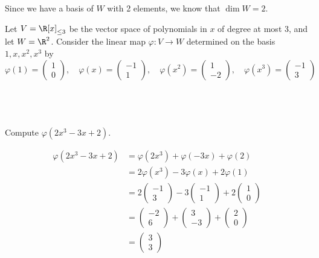 \documentclass[a4paper]{article}
\begin{document}
Since we have a basis of $W$ with 2 elements, we know that $\dim W = 2$.



\begin{questionbody}
Let $V = \R[x]_{\le 3}$ be the vector space of polynomials in $x$ of degree at most $3$, and let $W = \R^2$. Consider the linear map $\varphi : V \to W$ determined on the basis $1, x, x^2, x^3$ by
$$\varphi(1) = \begin{pmatrix}1\\ 0\end{pmatrix}, \quad \varphi(x) = \begin{pmatrix}-1\\ 1\end{pmatrix}, \quad \varphi(x^2) = \begin{pmatrix}1\\ -2\end{pmatrix}, \quad \varphi(x^3) = \begin{pmatrix}-1\\ 3\end{pmatrix}$$
\end{questionbody}

\subsection{~} %

\begin{questionbody}
Compute $\varphi(2x^3 - 3x + 2)$.
\end{questionbody}

\begin{align*}
\varphi(2x^3 - 3x + 2) &= \varphi(2x^3) + \varphi(-3x) + \varphi(2)\\[1ex]
&= 2 \varphi(x^3) - 3 \varphi(x) + 2 \varphi(1)\\[1ex]
&= 2 \begin{pmatrix}-1\\ 3\end{pmatrix} - 3 \begin{pmatrix}-1\\ 1\end{pmatrix} + 2 \begin{pmatrix}1\\ 0\end{pmatrix}\\[1ex]
&= \begin{pmatrix}-2\\ 6\end{pmatrix} + \begin{pmatrix}3\\ -3\end{pmatrix} + \begin{pmatrix}2\\ 0\end{pmatrix}\\[1ex]
&= \begin{pmatrix}3\\ 3\end{pmatrix}
\end{align*}
\end{document}
